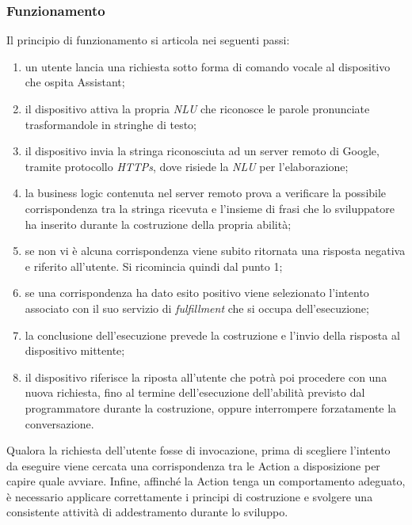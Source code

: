 		\subsubsection{Funzionamento}
		Il principio di funzionamento si articola nei seguenti passi:
		\begin{enumerate}
			\item un utente lancia una richiesta sotto forma di comando vocale al dispositivo che ospita Assistant;
			\item il dispositivo attiva la propria \textit{NLU} che riconosce le parole pronunciate trasformandole in stringhe di testo;
			\item il dispositivo invia la stringa riconosciuta ad un server remoto di Google, tramite protocollo \textit{HTTPs}, dove risiede la \textit{NLU} per l'elaborazione;
			\item la business logic contenuta nel server remoto prova a verificare la possibile corrispondenza tra la stringa ricevuta e l'insieme di frasi che lo sviluppatore ha inserito durante la costruzione della propria abilità;
			\item se non vi è alcuna corrispondenza viene subito ritornata una risposta negativa e riferito all'utente. Si ricomincia quindi dal punto 1;
			\item se una corrispondenza ha dato esito positivo viene selezionato l'intento associato con il suo servizio di \textit{fulfillment} che si occupa dell'esecuzione;
			\item la conclusione dell'esecuzione prevede la costruzione e l'invio della risposta al dispositivo mittente;
			\item il dispositivo riferisce la riposta all'utente che potrà poi procedere con una nuova richiesta, fino al termine dell'esecuzione dell'abilità previsto dal programmatore durante la costruzione, oppure interrompere forzatamente la conversazione.
		\end{enumerate}
		Qualora la richiesta dell'utente fosse di invocazione, prima di scegliere l'intento da eseguire viene cercata una corrispondenza tra le Action a disposizione per capire quale avviare.
		Infine, affinché la Action tenga un comportamento adeguato, è necessario applicare correttamente i principi di costruzione e svolgere una consistente attività di addestramento durante lo sviluppo.
